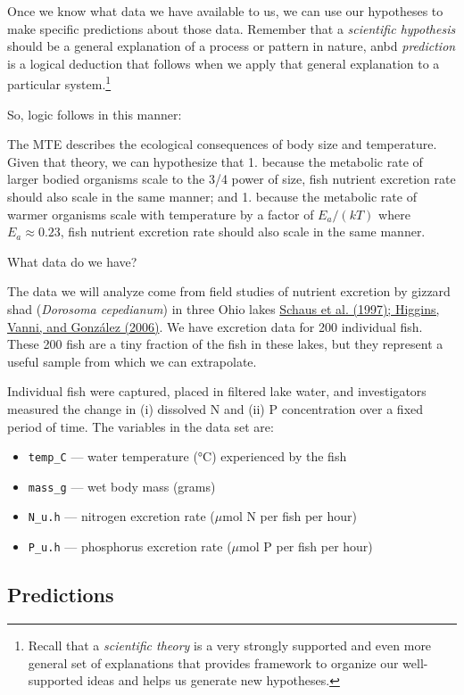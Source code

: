 \documentclass[
  letterpaper,
  DIV=11,
  numbers=noendperiod]{scrreprt}
\providecommand{\tightlist}{%
  \setlength{\itemsep}{0pt}\setlength{\parskip}{0pt}}
\begin{document}
Once we know what data we have available to us, we can use our
hypotheses to make specific predictions about those data. Remember that
a \emph{scientific hypothesis} should be a general explanation of a
process or pattern in nature, anbd \emph{prediction} is a logical
deduction that follows when we apply that general explanation to a
particular system.\footnote{Recall that a \emph{scientific theory} is a
  very strongly supported and even more general set of explanations that
  provides framework to organize our well-supported ideas and helps us
  generate new hypotheses.}

So, logic follows in this manner:

The MTE describes the ecological consequences of body size and
temperature. Given that theory, we can hypothesize that 1. because the
metabolic rate of larger bodied organisms scale to the 3/4 power of
size, fish nutrient excretion rate should also scale in the same manner;
and 1. because the metabolic rate of warmer organisms scale with
temperature by a factor of \(E_a/(kT)\) where \(E_a \approx 0.23\), fish
nutrient excretion rate should also scale in the same manner.

What data do we have?

The data we will analyze come from field studies of nutrient excretion
by gizzard shad (\emph{Dorosoma cepedianum}) in three Ohio lakes
\href{@fig-res}{Schaus et al. (1997); Higgins, Vanni, and González
(2006)}. We have excretion data for 200 individual fish. These 200 fish
are a tiny fraction of the fish in these lakes, but they represent a
useful sample from which we can extrapolate.

Individual fish were captured, placed in filtered lake water, and
investigators measured the change in (i) dissolved N and (ii) P
concentration over a fixed period of time. The variables in the data set
are:

\begin{itemize}
\tightlist
\item
  \texttt{temp\_C} --- water temperature (°C) experienced by the fish
\item
  \texttt{mass\_g} --- wet body mass (grams)
\item
  \texttt{N\_u.h} --- nitrogen excretion rate (\(\mu\)mol N per fish per
  hour)
\item
  \texttt{P\_u.h} --- phosphorus excretion rate (\(\mu\)mol P per fish
  per hour)
\end{itemize}

\subsection{Predictions}\label{predictions-2}
\end{document}
